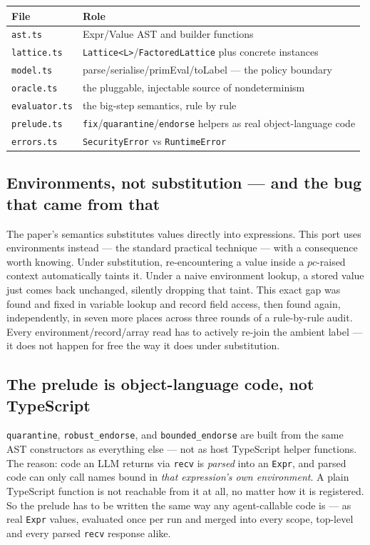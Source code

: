 \documentclass[11pt, a4paper]{article}
\begin{document}
\begin{descirption}
{\begin{center}
\begin{tabular}{@{}ll@{}}
\toprule
File & Role \\
\midrule
\texttt{ast.ts} & Expr/Value AST and builder functions \\
\texttt{lattice.ts} & \texttt{Lattice<L>}/\texttt{FactoredLattice} plus concrete instances \\
\texttt{model.ts} & parse/serialise/primEval/toLabel --- the policy boundary \\
\texttt{oracle.ts} & the pluggable, injectable source of nondeterminism \\
\texttt{evaluator.ts} & the big-step semantics, rule by rule \\
\texttt{prelude.ts} & \texttt{fix}/\texttt{quarantine}/\texttt{endorse} helpers as real object-language code \\
\texttt{errors.ts} & \texttt{SecurityError} vs \texttt{RuntimeError} \\
\bottomrule
\end{tabular}
\end{center}

\subsection{Environments, not substitution --- and the bug that came from that}
\label{sec:env-not-subst}

The paper's semantics substitutes values directly into expressions. This
port uses environments instead --- the standard practical technique ---
with a consequence worth knowing. Under substitution, re-encountering a
value inside a $pc$-raised context automatically taints it. Under a naive
environment lookup, a stored value just comes back unchanged, silently
dropping that taint. This exact gap was found and fixed in variable
lookup and record field access, then found again, independently, in seven
more places across three rounds of a rule-by-rule audit. Every
environment/record/array read has to actively re-join the ambient label
--- it does not happen for free the way it does under substitution.

\subsection{The prelude is object-language code, not TypeScript}

\lstinline{quarantine}, \lstinline{robust_endorse}, and
\lstinline{bounded_endorse} are built from the same AST constructors as
everything else --- not as host TypeScript helper functions. The reason:
code an LLM returns via \lstinline{recv} is \emph{parsed} into an
\lstinline{Expr}, and parsed code can only call names bound in \emph{that
expression's own environment}. A plain TypeScript function is not
reachable from it at all, no matter how it is registered. So the prelude
has to be written the same way any agent-callable code is --- as real
\lstinline{Expr} values, evaluated once per run and merged into every
scope, top-level and every parsed \lstinline{recv} response alike.

}
\end{descirption}
\end{document}
